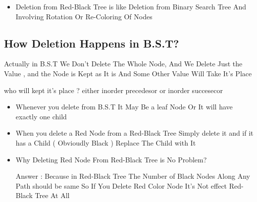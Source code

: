 \documentclass[12pt]{article}
\begin{document}
\begin{tcolorbox}
\begin{itemize}
	\item Deletion from Red-Black Tree is like Deletion from Binary Search Tree And Involving Rotation Or Re-Coloring Of Nodes
\end{itemize}
\end{tcolorbox}






\subsection{How Deletion Happens in B.S.T?}

Actually in B.S.T We Don't Delete The Whole Node, And We Delete Just the Value , and the Node is Kept as It is And Some Other Value Will Take It's Place

\noindent
who will kept it's place ?
either inorder precedesor or inorder succesecor





\begin{tcolorbox}
\begin{itemize}
	\item Whenever you delete from B.S.T It May Be a leaf Node Or It will have exactly one child
\end{itemize}
\end{tcolorbox}





\begin{tcolorbox}
\begin{itemize}
	\item When you delete a Red Node from a Red-Black Tree Simply delete it and if it has a Child ( Obvioudly Black ) Replace The Child with It
\end{itemize}
\end{tcolorbox}


\begin{tcolorbox}
\begin{itemize}
	\item Why Deleting Red Node From Red-Black Tree is No Problem?
	
	\noindent
	Answer : Because in Red-Black Tree The Number of Black Nodes Along Any Path should be same So If You Delete Red Color Node It's Not effect Red-Black Tree At All
\end{itemize}
\end{tcolorbox}
\end{document}
